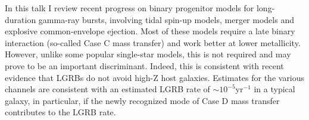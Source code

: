 


\bigskip



\bigskip

\noindent In this talk I review recent progress on binary progenitor models for
long-duration gamma-ray bursts, involving tidal spin-up models, merger
models and explosive common-envelope ejection. Most of these models
require a late binary interaction (so-called Case C mass transfer) and
work better at lower metallicity. However, unlike some popular
single-star models, this is not required and may prove to be an
important discriminant. Indeed, this is
consistent with recent evidence that LGRBs do not avoid high-Z host galaxies.  Estimates for the various channels are consistent with an estimated LGRB rate of $\sim 10^{-5} $yr$^{-1}$ in
a typical galaxy, in particular, if the newly recognized mode of Case
D mass transfer contributes to the LGRB rate.

